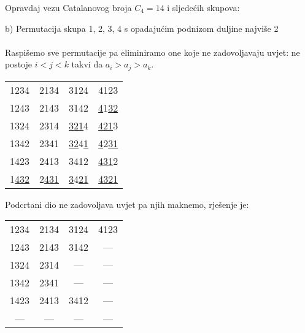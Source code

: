 \documentclass{article}
\begin{document}
	Opravdaj vezu Catalanovog broja \( C_4 = 14 \) i sljedećih skupova: 
	
	b) Permutacija skupa {1, 2, 3, 4} s opadajućim podnizom duljine najviše 2 \\ \\
	
	Raspišemo sve permutacije pa eliminiramo one koje ne zadovoljavaju uvjet: ne postoje \( i < j < k \) takvi da \( a_i > a_j > a_k \).
	
	\begin{center}
		\begin{tabular}{ cccc } 
	 		1234 & 2134 & 3124 & 4123 \\
			1243 & 2143 & 3142 & \underline{4}1\underline{32} \\
			1324 & 2314 & \underline{321}4 & \underline{421}3 \\
			1342 & 2341 & \underline{32}4\underline{1} & \underline{4}2\underline{31} \\ 
			1423 & 2413 & 3412 & \underline{431}2 \\ 
			1\underline{432} & 2\underline{431} & \underline{3}4\underline{21} & \underline{4321}
		\end{tabular}
	\end{center}
	
	Podcrtani dio ne zadovoljava uvjet pa njih maknemo, rješenje je:
	
	\begin{center}
		\begin{tabular}{ cccc } 
	 		1234 & 2134 & 3124 & 4123 \\
			1243 & 2143 & 3142 & ---  \\
			1324 & 2314 & ---  & ---  \\
			1342 & 2341 & ---  & ---  \\ 
			1423 & 2413 & 3412 & ---  \\ 
			---  & ---  & ---  & ---
		\end{tabular}
	\end{center}
\end{document}
